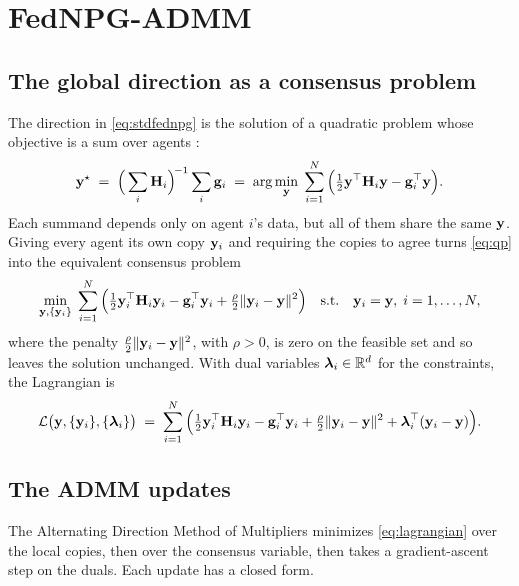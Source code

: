 \section{FedNPG-ADMM}
\label{sec:method}

\subsection{The global direction as a consensus problem}

The direction in \eqref{eq:stdfednpg} is the solution of a quadratic problem
whose objective is a sum over agents \citep{lan2023fednpgadmm}:
\begin{equation}
  \mathbf{y}^{\star}
  \;=\;\Big(\sum_i \mathbf{H}_i\Big)^{\!-1}\sum_i \mathbf{g}_i
  \;=\;\arg\min_{\mathbf{y}}\;
  \sum_{i=1}^{N}\Big(\tfrac{1}{2}\mathbf{y}^{\top}\mathbf{H}_i\mathbf{y} - \mathbf{g}_i^{\top}\mathbf{y}\Big).
  \label{eq:qp}
\end{equation}
Each summand depends only on agent $i$'s data, but all of them share the same
$\mathbf{y}$. Giving every agent its own copy $\mathbf{y}_i$ and requiring the copies to
agree turns \eqref{eq:qp} into the equivalent consensus problem
\begin{equation}
  \min_{\mathbf{y},\{\mathbf{y}_i\}}\;
  \sum_{i=1}^{N}\Big(\tfrac{1}{2}\mathbf{y}_i^{\top}\mathbf{H}_i\mathbf{y}_i - \mathbf{g}_i^{\top}\mathbf{y}_i
  + \tfrac{\rho}{2}\|\mathbf{y}_i - \mathbf{y}\|^2\Big)
  \quad \text{s.t.}\quad \mathbf{y}_i = \mathbf{y},\; i = 1,\dots,N,
  \label{eq:consensus}
\end{equation}
where the penalty $\tfrac{\rho}{2}\|\mathbf{y}_i - \mathbf{y}\|^2$, with $\rho > 0$, is
zero on the feasible set and so leaves the solution unchanged. With dual
variables $\boldsymbol{\lambda}_i \in \mathbb{R}^d$ for the constraints, the Lagrangian is
\begin{equation}
  \mathcal{L}\big(\mathbf{y}, \{\mathbf{y}_i\}, \{\boldsymbol{\lambda}_i\}\big) \;=\;
  \sum_{i=1}^{N}\Big(\tfrac{1}{2}\mathbf{y}_i^{\top}\mathbf{H}_i\mathbf{y}_i - \mathbf{g}_i^{\top}\mathbf{y}_i
  + \tfrac{\rho}{2}\|\mathbf{y}_i - \mathbf{y}\|^2 + \boldsymbol{\lambda}_i^{\top}(\mathbf{y}_i - \mathbf{y})\Big).
  \label{eq:lagrangian}
\end{equation}

\subsection{The ADMM updates}

The Alternating Direction Method of Multipliers \citep{boyd2011admm}
minimizes \eqref{eq:lagrangian} over the local copies, then over the
consensus variable, then takes a gradient-ascent step on the duals. Each
update has a closed form.

